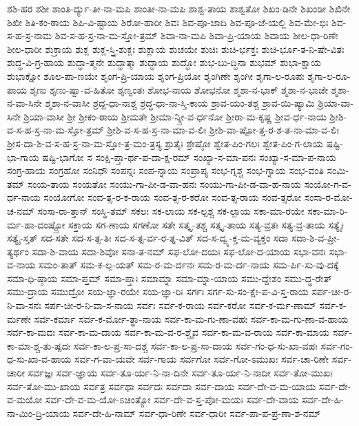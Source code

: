 {ಶಶಿ-ಹರ
ಶಶೀ
ಶಾಂತಿ-ರ್ದ್ಯು-ತೀ-ನಾ-ಮಪಿ
ಶಾಂತೀ-ನಾ-ಮಪಿ
ಶಾಶ್ವ-ತಾಯ
ಶಾಶ್ವತೋ
ಶಿಖಂ-ಡಿನೇ
ಶಿಖಂಡೀ
ಶಿಖಿನೇ
ಶಿಖೀ
ಶಿತಿ-ಕಂ-ಠಾಯ
ಶಿಪಿ-ವಿ-ಷ್ಟಾಯ
ಶಿರೋ-ಹಾರೀ
ಶಿವಃ
ಶಿವ-ಪೂ-ಜಾದಿ
ಶಿವ-ಪೂ-ಜೆ-ಯಲ್ಲಿ
ಶಿವ-ಮೇ-ಭಿಃ
ಶಿವ-ಸ-ಹ-ಸ್ರ-ನಾಮ
ಶಿವ-ಸ-ಹ-ಸ್ರ-ನಾ-ಮ-ಸ್ತೋ-ತ್ರಮ್
ಶಿವಾ-ನಾ-ಮಪಿ
ಶಿವಾ-ಪ್ರಿ-ಯಾಯ
ಶಿವಾಯ
ಶೀಲ-ಧಾ-ರಿಣೇ
ಶೀಲ-ಧಾರೀ
ಶುಕ್ರಾಯ
ಶುಕ್ಲ
ಶುಕ್ಲ-ಸ್ತ್ರಿ-ಶುಕ್ಲಃ
ಶುಕ್ಲಾಯ
ಶುಚಯೇ
ಶುಚಿಃ
ಶುಚಿ-ರ್ಭಕ್ತಃ
ಶುಚಿ-ರ್ಭೂ-ತ-ನಿ-ಷೇ-ವಿತಃ
ಶುದ್ಧ-ವಿ-ಗ್ರ-ಹಾಯ
ಶುದ್ಧಾ-ತ್ಮನೇ
ಶುದ್ಧಾತ್ಮಾ
ಶುದ್ಧಾಯ
ಶುದ್ಧೋ
ಶುಭ-ಬು-ದ್ಧಿನಾ
ಶುಭಮ್
ಶುಭಾ-ಕ್ಷಾಯ
ಶುಭಾಕ್ಷೋ
ಶೂಲ-ಪಾ-ಣಯೇ
ಶೃಂಗ-ಪ್ರಿ-ಯಾಯ
ಶೃಂಗ-ಪ್ರಿಯೋ
ಶೃಂಗಿಣೇ
ಶೃಂಗೀ
ಶೃಗಾ-ಲ-ರೂಪಃ
ಶೃಗಾ-ಲ-ರೂ-ಪಾಯ
ಶೃಣು
ಶೃಣು-ಷ್ವಾ-ವ-ಹಿತೋ
ಶೃಣ್ವಂತಃ
ಶೋಭ-ನಾಯ
ಶೋಭನೋ
ಶ್ಮಶಾ-ನ-ಭಾಕ್
ಶ್ಮಶಾ-ನ-ಭಾಜೇ
ಶ್ಮಶಾ-ನ-ವಾ-ಸಿನೇ
ಶ್ಮಶಾ-ನ-ವಾಸೀ
ಶ್ರದ್ದ-ಧಾ-ನಾಶ್ಚ
ಶ್ರದ್ಧ-ಧಾ-ನಾ-ಸ್ತಿ-ಕಾಯ
ಶ್ರಾವ-ಯಂ-ತಶ್ಚ
ಶ್ರಾವ-ಯಿ-ಷ್ಯಾಮಿ
ಶ್ರಿಯಾ-ವಾ-ಸಿನೇ
ಶ್ರಿಯಾ-ವಾಸೀ
ಶ್ರೀ
ಶ್ರೀಕಂ-ಠಾಯ
ಶ್ರೀಮತೇ
ಶ್ರೀಮಾ-ನ್ಶ್ರೀ-ವ-ರ್ಧನೋ
ಶ್ರೀರಾ-ಮ-ಕೃಷ್ಣ
ಶ್ರೀವ-ರ್ಧ-ನಾಯ
ಶ್ರೀಶಿ-ವ-ಸ-ಹ-ಸ್ರ-ನಾ-ಮ-ಸ್ತೋ-ತ್ರಮ್
ಶ್ರೀಶಿ-ವ-ಸ-ಹ-ಸ್ರ-ನಾ-ಮಾ-ವ-ಲಿಃ
ಶ್ರೀಶಿ-ವಾ-ಷ್ಟೋ-ತ್ತ-ರ-ಶ-ತ-ನಾ-ಮಾ-ವ-ಲಿಃ
ಶ್ರೀಸ-ದಾ-ಶಿ-ವ-ಸ-ಹ-ಸ್ರ-ನಾ-ಮ-ಸ್ತೋ-ತ್ರ-ಮಂ-ತ್ರಸ್ಯ
ಶ್ರುತೈಃ
ಶ್ರೇಷ್ಠೋ
ಶ್ವೇತ-ಪಿಂ-ಗಲಃ
ಶ್ವೇತ-ಪಿಂ-ಗ-ಲಾಯ
ಷಷ್ಟಿ-ಭಾ-ಗಾಯ
ಷಷ್ಟಿ-ಭಾಗೋ
ಸ
ಸಂಕ್ಷಿ-ಪ್ತಾ-ರ್ಥ-ಪ-ದಾ-ಕ್ಷ-ರಮ್
ಸಂಖ್ಯಾ-ಸ-ಮಾ-ಪನಃ
ಸಂಖ್ಯಾ-ಸ-ಮಾ-ಪ-ನಾಯ
ಸಂಗ್ರ-ಹಾಯ
ಸಂಗ್ರಹೋ
ಸಂನಿಧೌ
ಸಂಪನ್ನಃ
ಸಂಪ-ನ್ನಾಯ
ಸಂಪ್ರಾಪ್ಯ
ಸಂಭ-ಗ್ನಶ್ಚ
ಸಂಭ-ಗ್ನಾಯ
ಸಂಭ-ವಂತಿ
ಸಂಮಿ-ತಮ್
ಸಂಯ-ತಾಯ
ಸಂಯತೋ
ಸಂಯು-ಗಾ-ಪೀ-ಡ-ವಾ-ಹನಃ
ಸಂಯು-ಗಾ-ಪೀ-ಡ-ವಾ-ಹ-ನಾಯ
ಸಂಯೋ-ಗ-ವ-ರ್ಧ-ನಾಯ
ಸಂಯೋಗೋ
ಸಂವ-ತ್ಸ-ರ-ಕ-ರಾಯ
ಸಂವ-ತ್ಸ-ರ-ಕರೋ
ಸಂವ-ತ್ಸ-ರಾಯ
ಸಂವ-ತ್ಸರೋ
ಸಂಸಾ-ರ-ಮೋ-ಚ-ನಮ್
ಸಂಸಾ-ರಾ-ತ್ತಾನ್
ಸಂಸ್ಥಿ-ತಮ್
ಸಕಲಃ
ಸಕ-ಲಾಯ
ಸಕ-ಲ್ಪಶ್ಚ
ಸಕ-ಲ್ಪಾಯ
ಸಕಾ-ಮಾ-ರಯೇ
ಸಕಾ-ಮಾ-ರಿ-ರ್ಮ-ಹಾ-ದಂಷ್ಟ್ರೋ
ಸಕ್ತಾಯ
ಸಗ-ಣಾಯ
ಸಗಣೋ
ಸತೇ
ಸತ್ಕೃ-ತಶ್ಚ
ಸತ್ಕೃ-ತಾಯ
ಸತ್ಯ-ವ್ರತಃ
ಸತ್ಯ-ವ್ರ-ತಾಯ
ಸತ್ಯೈಃ
ಸತ್ಯೈ-ಸ್ತತ್
ಸದ-ಸತೇ
ಸದ-ಸ-ತ್ಪ-ತಿಃ
ಸದ-ಸ-ತ್ಸ-ರ್ವ-ರ-ತ್ನ-ವಿತ್
ಸದ-ಸ-ದ್ವ್ಯ-ಕ್ತ-ಮ-ವ್ಯಕ್ತಂ
ಸದಾ
ಸದಾ-ಶಿ-ವ-ಪ್ರೀ-ತ್ಯರ್ಥಂ
ಸದಾ-ಶಿ-ವಾಯ
ಸದಾ-ಶಿವೋ
ಸನಾ-ತ-ನಮ್
ಸಫ-ಲೋ-ದಯಃ
ಸಫ-ಲೋ-ದ-ಯಾಯ
ಸಭಾ-ವನಃ
ಸಭಾ-ವ-ನಾಯ
ಸಮಂ-ತಾತ್
ಸಮ-ಕ-ಲ್ಪ-ಯತ್
ಸಮ-ರ-ಮ-ರ್ದನಃ
ಸಮ-ರ-ಮ-ರ್ದ-ನಾಯ
ಸಮ-ರ್ಪಿ-ಸು-ವು-ದಕ್ಕೆ
ಸಮಾ-ಧಿ-ಷ್ಠಾಯ
ಸಮಾ-ಪ್ತಮ್
ಸಮಾ-ಪ್ತಾಃ
ಸಮಾಮ್ನಾ
ಸಮಾ-ಮ್ನಾ-ಯಾಯ
ಸಮು-ದ್ದೇಶಂ
ಸಮು-ದ್ಧ-ರೇತ್
ಸಮು-ದ್ರಾಯ
ಸಮುದ್ರೋ
ಸಯ-ಜ್ಞಾ-ರಯೇ
ಸಯ-ಜ್ಞಾ-ರಿಃ
ಸರ್ಗಃ
ಸರ್ಗ-ಸು-ಸಂ-ಕ್ಷೇ-ಪ-ವಿ-ಸ್ತ-ರಾಯ
ಸರ್ಪ-ಚೀ-ರ-ನಿ-ವಾ-ಸನಃ
ಸರ್ಪ-ಚೀ-ರ-ನಿ-ವಾ-ಸ-ನಾಯ
ಸರ್ವಃ
ಸರ್ವ-ಕ-ರಾಯ
ಸರ್ವ-ಕರೋ
ಸರ್ವ-ಕ-ರ್ಮ-ಣಾಮ್
ಸರ್ವ-ಕ-ರ್ಮಣೇ
ಸರ್ವ-ಕರ್ಮಾ
ಸರ್ವ-ಕ-ರ್ಮೋ-ತ್ಥಾ-ನಾಯ
ಸರ್ವ-ಕಾ-ಮ-ಗು-ಣಾ-ವಹಃ
ಸರ್ವ-ಕಾ-ಮ-ಗು-ಣಾ-ವ-ಹಾಯ
ಸರ್ವ-ಕಾ-ಮದಃ
ಸರ್ವ-ಕಾ-ಮ-ದಾಯ
ಸರ್ವ-ಕಾ-ಮ-ವ-ರ-ಶ್ಚೈವ
ಸರ್ವ-ಕಾ-ಮ-ವ-ರಾಯ
ಸರ್ವ-ಕಾ-ಮಾಯ
ಸರ್ವ-ಕಾ-ಮಾ-ಶ್ಚ-ತು-ಷ್ಪದಃ
ಸರ್ವ-ಕಾ-ಲ-ಪ್ರ-ಸಾ-ದಶ್ಚ
ಸರ್ವ-ಕಾ-ಲ-ಪ್ರ-ಸಾ-ದಾಯ
ಸರ್ವ-ಗಂ-ಧ-ಸು-ಖಾ-ವಹಃ
ಸರ್ವ-ಗಂ-ಧ-ಸು-ಖಾ-ವ-ಹಾಯ
ಸರ್ವ-ಗ-ವಾ-ಯವೇ
ಸರ್ವ-ಗಾಯ
ಸರ್ವಗೋ
ಸರ್ವ-ಗೋ-ಽಮುಖಃ
ಸರ್ವ-ಚಾ-ರಿಣೇ
ಸರ್ವ-ಚಾರೀ
ಸರ್ವಜ್ಞಃ
ಸರ್ವ-ಜ್ಞಾಯ
ಸರ್ವ-ತೂ-ರ್ಯ-ನಿ-ನಾ-ದಿನೇ
ಸರ್ವ-ತೂ-ರ್ಯ-ನಿ-ನಾದೀ
ಸರ್ವ-ತೋ-ಮುಖಃ
ಸರ್ವ-ತೋ-ಮು-ಖಾಯ
ಸರ್ವತ್ರ
ಸರ್ವಥಾ
ಸರ್ವದಃ
ಸರ್ವದಾ
ಸರ್ವ-ದಾಯ
ಸರ್ವ-ದೇ-ವ-ಮ-ಯಾಯ
ಸರ್ವ-ದೇ-ವ-ಮಯೋ
ಸರ್ವ-ದೇ-ವ-ಮ-ಯೋ-ಽಚಿಂತ್ಯೋ
ಸರ್ವ-ದೇ-ವ-ಸ್ತ-ಪೋ-ಮಯಃ
ಸರ್ವ-ದೇ-ವಾಯ
ಸರ್ವ-ದೇ-ಹಿ-ನಾ-ಮಿಂ-ದ್ರಿ-ಯಾಯ
ಸರ್ವ-ದೇ-ಹಿ-ನಾಮ್
ಸರ್ವ-ಧಾ-ರಿಣೇ
ಸರ್ವ-ಧಾರೀ
ಸರ್ವ-ಪಾ-ಪ-ಪ್ರ-ಣಾ-ಶ-ನಮ್
}
